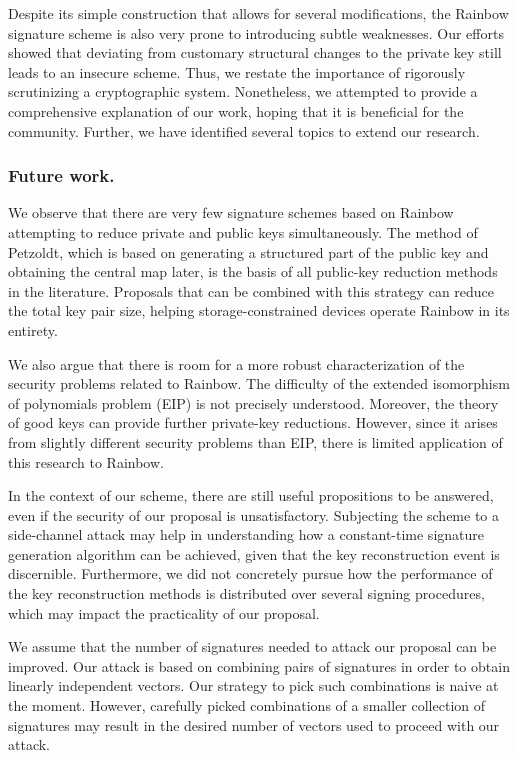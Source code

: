 \documentclass[12pt, a4paper, oneside]{memoir}
\theoremstyle{definition}
\begin{document}
Despite its simple construction that allows for several modifications, the Rainbow signature scheme is also very prone to introducing subtle weaknesses. Our efforts showed that deviating from customary structural changes to the private key still leads to an insecure scheme. Thus, we restate the importance of rigorously scrutinizing a cryptographic system. Nonetheless, we attempted to provide a comprehensive explanation of our work, hoping that it is beneficial for the community. Further, we have identified several topics to extend our research.

\subsubsection{Future work.}

We observe that there are very few signature schemes based on Rainbow attempting to reduce private and public keys simultaneously. The method of Petzoldt, which is based on generating a structured part of the public key and obtaining the central map later, is the basis of all public-key reduction methods in the literature. Proposals that can be combined with this strategy can reduce the total key pair size, helping storage-constrained devices operate Rainbow in its entirety.

We also argue that there is room for a more robust characterization of the security problems related to Rainbow. The difficulty of the extended isomorphism of polynomials problem (EIP) is not precisely understood. Moreover, the theory of good keys can provide further private-key reductions. However, since it arises from slightly different security problems than EIP, there is limited application of this research to Rainbow.

In the context of our scheme, there are still useful propositions to be answered, even if the security of our proposal is unsatisfactory. Subjecting the scheme to a side-channel attack may help in understanding how a constant-time signature generation algorithm can be achieved, given that the key reconstruction event is discernible. Furthermore, we did not concretely pursue how the performance of the key reconstruction methods is distributed over several signing procedures, which may impact the practicality of our proposal.

We assume that the number of signatures needed to attack our proposal can be improved. Our attack is based on combining pairs of signatures in order to obtain linearly independent vectors. Our strategy to pick such combinations is naive at the moment. However, carefully picked combinations of a smaller collection of signatures may result in the desired number of vectors used to proceed with our attack.
\end{document}
